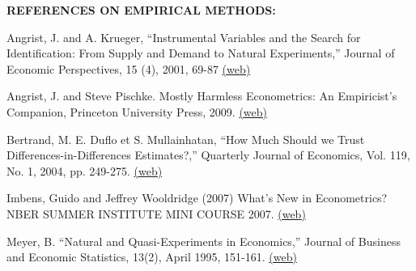 \documentclass[landscape]{slides}
\begin{document}
\begin{slide}
\begin{center}
{\bf REFERENCES ON EMPIRICAL METHODS:}
\end{center}
{\small


Angrist, J. and A. Krueger, ``Instrumental Variables and the Search for Identification: From Supply and Demand to Natural Experiments,'' Journal of Economic Perspectives, 15 (4), 2001, 69-87 \href{http://www.jstor.org/stable/pdfplus/2696517.pdf} {(web)}

Angrist, J. and Steve Pischke. Mostly Harmless Econometrics: An Empiricist's Companion, Princeton University Press, 2009. \href{http://www.mostlyharmlesseconometrics.com/} {(web)}

Bertrand, M. E. Duflo et S. Mullainhatan, ``How Much Should we Trust Differences-in-Differences Estimates?,'' Quarterly Journal of Economics, Vol. 119, No. 1, 2004, pp. 249-275. \href{http://www.jstor.org/stable/pdfplus/25098683.pdf} {(web)}

Imbens, Guido and Jeffrey Wooldridge (2007) What's New in Econometrics? NBER SUMMER INSTITUTE MINI COURSE 2007. \href{http://www.nber.org/minicourse3.html} {(web)}

Meyer, B. ``Natural and Quasi-Experiments in Economics,'' Journal of Business and Economic Statistics, 13(2), April 1995, 151-161. \href{http://www.jstor.org/stable/pdfplus/1392369.pdf} {(web)}

}
\end{slide}
\end{document}
